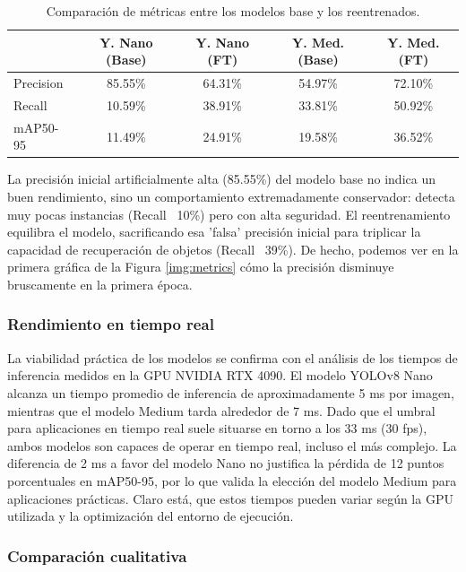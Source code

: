 \documentclass[11pt,a4paper]{article}
\begin{document}
\begin{table}[H]
    \centering
    \begin{tabular}{lcccc}
        \toprule
         & \textbf{Y. Nano (Base)} & \textbf{Y. Nano (FT)} & \textbf{Y. Med. (Base)} & \textbf{Y. Med. (FT)} \\
        \midrule
        Precision & 85.55\% & 64.31\% & 54.97\% & 72.10\% \\
        Recall & 10.59\% & 38.91\% & 33.81\% & 50.92\% \\
        mAP50-95 & 11.49\% & 24.91\% & 19.58\% & 36.52\% \\
        \bottomrule
    \end{tabular}
    \caption{Comparación de métricas entre los modelos base y los reentrenados.}
    \label{tab:base_vs_finetuned}
\end{table}

La precisión inicial artificialmente alta (85.55\%) del modelo base no indica un buen rendimiento, 
sino un comportamiento extremadamente conservador: detecta muy pocas instancias (Recall ~10\%) 
pero con alta seguridad. El reentrenamiento equilibra el modelo, sacrificando esa 'falsa' 
precisión inicial para triplicar la capacidad de recuperación de objetos (Recall ~39\%).
De hecho, podemos ver en la primera gráfica de la Figura \ref{img:metrics} cómo la precisión disminuye 
bruscamente en la primera época.

\subsubsection{Rendimiento en tiempo real}

La viabilidad práctica de los modelos se confirma con el análisis de los tiempos de inferencia medidos en la GPU NVIDIA RTX 4090.
El modelo YOLOv8 Nano alcanza un tiempo promedio de inferencia de aproximadamente 5 ms por imagen, mientras que el modelo Medium
tarda alrededor de 7 ms. Dado que el umbral para aplicaciones en tiempo real suele situarse en torno a los 33 ms (30 fps), 
ambos modelos son capaces de operar en tiempo real, incluso el más complejo. La diferencia de 2 ms 
a favor del modelo Nano no justifica la pérdida de 12 puntos porcentuales en mAP50-95, por lo que
valida la elección del modelo Medium para aplicaciones prácticas. Claro está, que estos tiempos pueden variar
según la GPU utilizada y la optimización del entorno de ejecución.

\subsubsection{Comparación cualitativa}
\end{document}
